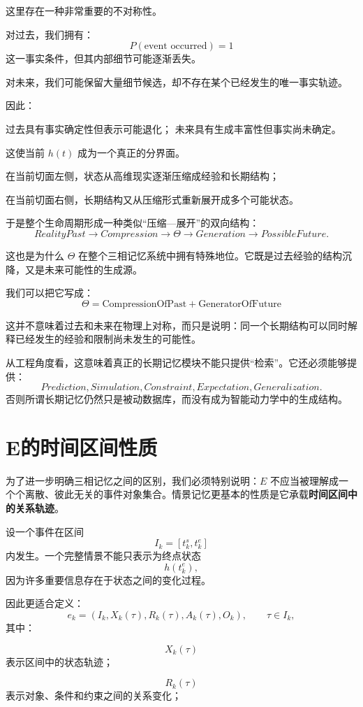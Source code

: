 这里存在一种非常重要的不对称性。

对过去，我们拥有：
\[
P(\text{event occurred})=1
\]
这一事实条件，但其内部细节可能逐渐丢失。

对未来，我们可能保留大量细节候选，却不存在某个已经发生的唯一事实轨迹。

因此：
\begin{statementbox}
过去具有事实确定性但表示可能退化；
未来具有生成丰富性但事实尚未确定。
\end{statementbox}

这使当前 \(h(t)\) 成为一个真正的分界面。

在当前切面左侧，状态从高维现实逐渐压缩成经验和长期结构；

在当前切面右侧，长期结构又从压缩形式重新展开成多个可能状态。

于是整个生命周期形成一种类似“压缩—展开”的双向结构：
\[
RealityPast
\rightarrow
Compression
\rightarrow
\Theta
\rightarrow
Generation
\rightarrow
PossibleFuture.
\]

这也是为什么 \(\Theta\) 在整个三相记忆系统中拥有特殊地位。它既是过去经验的结构沉降，又是未来可能性的生成源。

我们可以把它写成：
\[
\boxed{
\Theta
=
\text{CompressionOfPast}
+
\text{GeneratorOfFuture}
}
\]

这并不意味着过去和未来在物理上对称，而只是说明：同一个长期结构可以同时解释已经发生的经验和限制尚未发生的可能性。

从工程角度看，这意味着真正的长期记忆模块不能只提供“检索”。它还必须能够提供：
\[
Prediction,
Simulation,
Constraint,
Expectation,
Generalization.
\]
否则所谓长期记忆仍然只是被动数据库，而没有成为智能动力学中的生成结构。

\section{E的时间区间性质}

为了进一步明确三相记忆之间的区别，我们必须特别说明：\(E\) 不应当被理解成一个个离散、彼此无关的事件对象集合。情景记忆更基本的性质是它承载\textbf{时间区间中的关系轨迹}。

设一个事件在区间
\[
I_k=[t_k^s,t_k^e]
\]
内发生。一个完整情景不能只表示为终点状态
\[
h(t_k^e),
\]
因为许多重要信息存在于状态之间的变化过程。

因此更适合定义：
\[
e_k
=
\left(
I_k,
X_k(\tau),
R_k(\tau),
A_k(\tau),
O_k
\right),
\qquad
\tau\in I_k,
\]
其中：

\[
X_k(\tau)
\]
表示区间中的状态轨迹；

\[
R_k(\tau)
\]
表示对象、条件和约束之间的关系变化；

